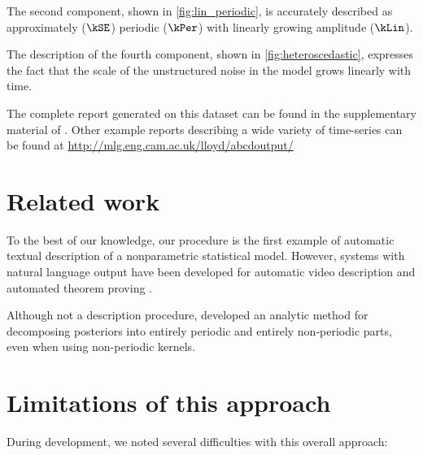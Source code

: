 The second component, shown in \cref{fig:lin_periodic}, is accurately described as approximately ($\kSE$) periodic ($\kPer$) with linearly growing amplitude ($\kLin$).

The description of the fourth component, shown in \cref{fig:heteroscedastic}, expresses the fact that the scale of the unstructured noise in the model grows linearly with time.

The complete report generated on this dataset can be found in the supplementary material of \citet{LloDuvGroetal14}.
Other example reports describing a wide variety of time-series can be found at \url{http://mlg.eng.cam.ac.uk/lloyd/abcdoutput/}


\section{Related work}
\label{sec:description-related-work}
To the best of our knowledge, our procedure is the first example of automatic textual description of a nonparametric statistical model.
However, systems with natural language output have been developed for automatic video description \citep{barbu2012video} and automated theorem proving \citep{ganesalingam2013fully}.

Although not a description procedure, \citet{durrande2013gaussian} developed an analytic method for decomposing \gp{} posteriors into entirely periodic and entirely non-periodic parts, even when using non-periodic kernels.



\section{Limitations of this approach}
\label{sec:limitations-of-abcd}

During development, we noted several difficulties with this overall approach:

